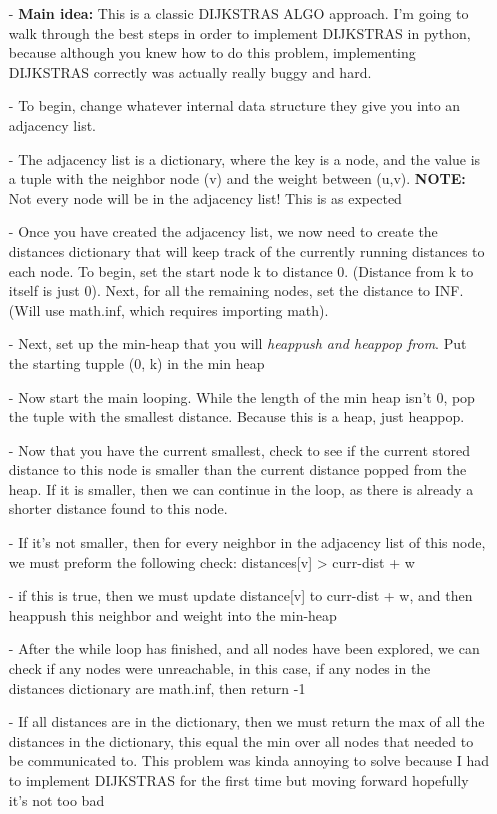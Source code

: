 \documentclass[12pt]{article}
\begin{document}
\begin{enumerate}
    \begin{enumerate}
      \item[-] \textbf{Main idea:} This is a classic DIJKSTRAS ALGO approach. I'm going to walk through the best steps in order to implement DIJKSTRAS in python, because although you knew how to do this problem, implementing DIJKSTRAS correctly was actually really buggy and hard.
      \item[-] To begin, change whatever internal data structure they give you into an adjacency list. 
      \item[-] The adjacency list is a dictionary, where the key is a node, and the value is a tuple with the neighbor node (v) and the weight between (u,v). \textbf{NOTE:} Not every node will be in the adjacency list! This is as expected
      \item[-] Once you have created the adjacency list, we now need to create the distances dictionary that will keep track of the currently running distances to each node. To begin, set the start node k to distance 0. (Distance from k to itself is just 0). Next, for all the remaining nodes, set the distance to INF. (Will use math.inf, which requires importing math). 
      \item[-] Next, set up the min-heap that you will \textit{heappush and heappop from}. Put the starting tupple (0, k) in the min heap
      \item[-] Now start the main looping. While the length of the min heap isn't 0, pop the tuple with the smallest distance. Because this is a heap, just heappop.
      \item[-] Now that you have the current smallest, check to see if the current stored distance to this node is smaller than the current distance popped from the heap. If it is smaller, then we can continue in the loop, as there is already a shorter distance found to this node. 
      \item[-] If it's not smaller, then for every neighbor in the adjacency list of this node, we must preform the following check: distances[v] > curr-dist + w
      \item[-] if this is true, then we must update distance[v] to curr-dist + w, and then heappush this neighbor and weight into the min-heap
      \item[-] After the while loop has finished, and all nodes have been explored, we can check if any nodes were unreachable, in this case, if any nodes in the distances dictionary are math.inf, then return -1
      \item[-] If all distances are in the dictionary, then we must return the max of all the distances in the dictionary, this equal the min over all nodes that needed to be communicated to. This problem was kinda annoying to solve because I had to implement DIJKSTRAS for the first time but moving forward hopefully it's not too bad
    \end{enumerate}
\end{enumerate}
\end{document}
